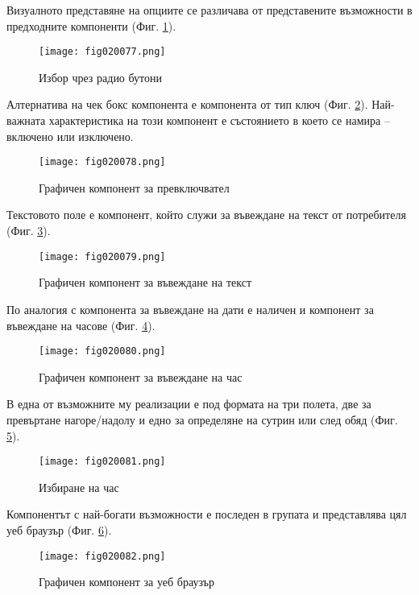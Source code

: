 Визуалното представяне на опциите се различава от представените възможности в предходните компоненти (Фиг. \ref{fig020077}).

\begin{figure}[H]
  \centering
  \texttt{[image: fig020077.png]}
  \caption{Избор чрез радио бутони}
\label{fig020077}
\end{figure}

Алтернатива на чек бокс компонента е компонента от тип ключ (Фиг. \ref{fig020078}). Най-важната характеристика на този компонент е състоянието в което се намира – включено или изключено. 

\begin{figure}[H]
  \centering
  \texttt{[image: fig020078.png]}
  \caption{Графичен компонент за превключвател}
\label{fig020078}
\end{figure}

Текстовото поле е компонент, който служи за въвеждане на текст от потребителя (Фиг. \ref{fig020079}).

\begin{figure}[H]
  \centering
  \texttt{[image: fig020079.png]}
  \caption{Графичен компонент за въвеждане на текст}
\label{fig020079}
\end{figure}

По аналогия с компонента за въвеждане на дати е наличен и компонент за въвеждане на часове (Фиг. \ref{fig020080}). 

\begin{figure}[H]
  \centering
  \texttt{[image: fig020080.png]}
  \caption{Графичен компонент за въвеждане на час}
\label{fig020080}
\end{figure}

В една от възможните му реализации е под формата на три полета, две за превъртане нагоре/надолу и едно за определяне на сутрин или след обяд (Фиг. \ref{fig020081}).

\begin{figure}[H]
  \centering
  \texttt{[image: fig020081.png]}
  \caption{Избиране на час}
\label{fig020081}
\end{figure}

Компонентът с най-богати възможности е последен в групата и представлява цял уеб браузър (Фиг. \ref{fig020082}).

\begin{figure}[H]
  \centering
  \texttt{[image: fig020082.png]}
  \caption{Графичен компонент за уеб браузър}
\label{fig020082}
\end{figure}

